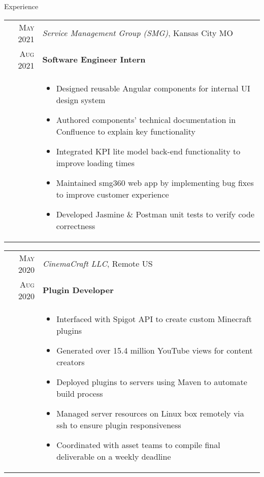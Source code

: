 \documentclass{resume}
\begin{document}
\begin{rSection}{Experience}
\small
{
  \begin{tabular}{r|p{15cm}}
    \textsc{May 2021} & \textit{Service Management Group (SMG)}, Kansas City MO \\
    \textsc{Aug 2021}  & \textbf{Software Engineer Intern} \\ &
    \begin{itemize}
      \item {Designed reusable Angular components for internal UI design system}
      \item {Authored components' technical documentation in Confluence to explain key functionality}
      \item {Integrated KPI lite model back-end functionality to improve loading times}
      \item {Maintained smg360 web app by implementing bug fixes to improve customer experience}
      \item {Developed Jasmine \& Postman unit tests to verify code correctness}
    \end{itemize}
  \end{tabular}
  
  \begin{tabular}{r|p{15cm}}
    \textsc{May 2020} & \textit{CinemaCraft LLC}, Remote US \\
    \textsc{Aug 2020} & \textbf{Plugin Developer} \\ &
    \begin{itemize}
      \item {Interfaced with Spigot API to create custom Minecraft plugins}
      \item {Generated over 15.4 million YouTube views for content creators}
      \item {Deployed plugins to servers using Maven to automate build process}
      \item {Managed server resources on Linux box remotely via ssh to ensure plugin responsiveness}
      \item {Coordinated with asset teams to compile final deliverable on a weekly deadline}
    \end{itemize}
  \end{tabular}
  
}
\end{rSection}
\end{document}
